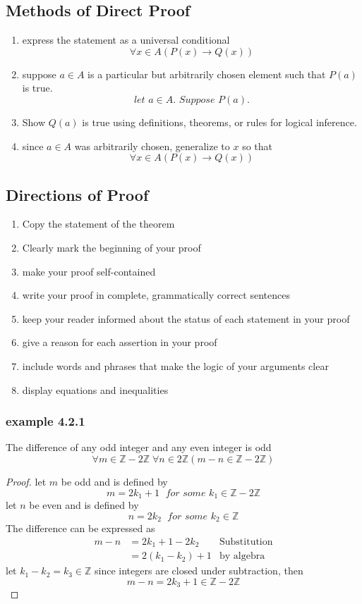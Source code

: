 \documentclass[12pt]{book}
\newcommand{\Z}{\mathbb{Z}}
\newcommand{\paren}[1]{\left( #1 \right)}
\begin{document}
\subsection{Methods of Direct Proof}
\begin{enumerate}
    \item express the statement as a universal conditional 
        \[
        \forall x \in A (P(x) \rightarrow Q(x))
        \]
    \item suppose $a \in A$ is a particular but arbitrarily chosen element such that $P(a)$ is true.
        \[
        \textit{let } a\in A \textit{. Suppose }P(a).
        \]
    \item Show $Q(a)$ is true using definitions, theorems, or rules for logical inference. 
    \item since $a \in A$ was arbitrarily chosen, generalize to $x$ so that 
        \[
        \forall x \in A (P(x) \rightarrow Q(x))
        \]
\end{enumerate}
\subsection{Directions of Proof}
\begin{enumerate}
    \item Copy the statement of the theorem
    \item Clearly mark the beginning of your proof
    \item make your proof self-contained
    \item write your proof in complete, grammatically correct sentences
    \item keep your reader informed about the status of each statement in your proof
    \item give a reason for each assertion in your proof
    \item include words and phrases that make the logic of your arguments clear
    \item display equations and inequalities
\end{enumerate}


\subsubsection{example 4.2.1}
    The difference of any odd integer and any even integer is odd
    \[
    \forall m \in \Z - 2\Z \; \forall n \in 2\Z \paren{m-n \in \Z - 2\Z}
    \]
    \begin{proof}
        let $m$ be odd and is defined by
        \[
        m=2k_1 + 1 \; \textit{ for some } k_1 \in \Z - 2\Z
        \]
        let $n$ be even and is defined by 
        \[
        n=2k_2 \; \textit{ for some } k_2 \in \Z
        \]
        The difference can be expressed as
        \begin{align*}
            m-n &= 2k_1+1-2k_2 & \text{Substitution} \\
                &=2(k_1-k_2)+1 & \text{by algebra}
        \end{align*}
        let $k_1-k_2 = k_3 \in \Z$ since integers are closed under subtraction, then
        \[
        m-n = 2k_3+1 \in \Z - 2\Z
        \]
    \end{proof}
\end{document}
